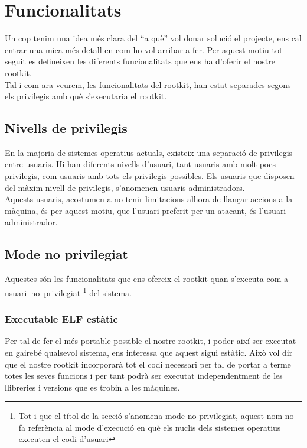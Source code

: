 \chapter{Funcionalitats}

Un cop tenim una idea més clara del ``a què'' vol donar solució el projecte, ens cal entrar una mica més
detall en com ho vol arribar a fer. Per aquest motiu tot seguit es defineixen les diferents funcionalitats 
que ens ha d'oferir el nostre rootkit. \\

Tal i com ara veurem, les funcionalitats del rootkit, han estat separades segons els privilegis amb què s'executaria 
el rootkit.

\section{Nivells de privilegis}

En la majoria de sistemes operatius actuals, existeix una separació de privilegis entre usuaris. Hi
han diferents nivells d'usuari, tant usuaris amb molt pocs privilegis, com usuaris amb tots els privilegis
possibles. Els usuaris que disposen del màxim nivell de privilegis, s'anomenen usuaris administradors. \\
Aquests usuaris, acostumen a no tenir limitacions alhora de llançar accions a la màquina, és per aquest
motiu, que l'usuari preferit per un atacant, és l'usuari administrador. \\

\section{Mode no privilegiat}

Aquestes són les funcionalitats que ens ofereix el rootkit quan s'executa com a \mbox{usuari no privilegiat}
\footnote{Tot i que el títol de la secció s'anomena mode no privilegiat, aquest nom no fa referència al mode d'execució
en què els nuclis dels sistemes operatius executen el codi d'usuari} del sistema.

\subsection{Executable ELF estàtic}
Per tal de fer el més portable possible el nostre rootkit, i poder així ser executat en gairebé qualsevol sistema, ens 
interessa que aquest sigui estàtic. Això vol dir que el nostre rootkit incorporarà tot el codi necessari per tal de portar 
a terme totes les seves funcions i per tant podrà ser executat independentment de les llibreries i versions que es trobin a
les màquines.

